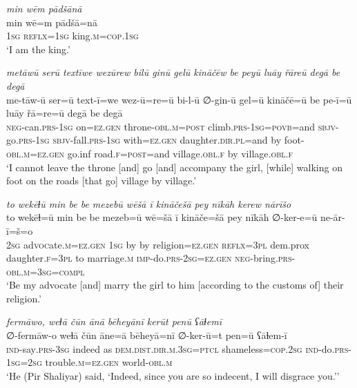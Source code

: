 \ea \label{ŽP.160}
\textit{min wēm pādšānā} \\ 
\gll min wē=m pādšā=nā \\ 
 \textsc{1sg} \textsc{reflx}\textsc{=\textsc{1sg}} king\textsc{.m}\textsc{=cop}\textsc{.\textsc{1sg}} \\ 
\glt `I am the king.'
\z 
 
\ea \label{ŽP.161}
\textit{metāwū serū textīwe wezūrew bilū ginū gelū kināčēw be peyū luāy řāreū degā be degā} \\ 
\gll me-tāw-ū ser=ū text-ī=we wez-ū=re=ū bi-l-ū ∅-gin-ū gel=ū kināčē=ū be pe-ī=ū luāy řā=re=ū degā be degā \\ 
 \textsc{neg-}can\textsc{.prs}\textsc{-\textsc{1sg}} on\textsc{\textsc{=ez.gen}} throne\textsc{-obl}\textsc{.m}\textsc{=\textsc{post}} climb\textsc{.prs}\textsc{-\textsc{1sg}}\textsc{=\textsc{povb}}=and \textsc{sbjv-}go\textsc{.prs}\textsc{-\textsc{1sg}} \textsc{sbjv-}fall\textsc{.prs}\textsc{-\textsc{1sg}} with\textsc{\textsc{=ez.gen}} daughter\textsc{.dir}\textsc{.pl}=and by foot\textsc{-obl}\textsc{.m}\textsc{\textsc{=ez.gen}} go.inf road\textsc{.f}\textsc{=\textsc{post}}=and village\textsc{.obl}\textsc{.f} by village\textsc{.obl}\textsc{.f} \\ 
\glt `I cannot leave the throne [and] go [and] accompany the girl, [while] walking on foot on the roads [that go] village by village.'
\z 
 
\ea \label{ŽP.165}
\textit{to wekēɫū min be be mezebū wēšā ī kināčešā pey nīkāh kerew nārīšo} \\ 
\gll to wekēɫ=ū min be be mezeb=ū wē=šā ī kināče=šā pey nīkāh ∅-ker-e=ū ne-ār-ī=š=o \\ 
 \textsc{2sg} ad\textsc{voc}ate\textsc{.m}\textsc{\textsc{=ez.gen}} \textsc{1sg} by by religion\textsc{\textsc{=ez.gen}} \textsc{reflx}\textsc{=3pl} dem.prox daughter\textsc{.f}\textsc{=3pl} to marriage\textsc{.m} \textsc{imp-}do\textsc{.prs}-\textsc{2sg}\textsc{\textsc{=ez.gen}} \textsc{neg-}bring\textsc{.prs}\textsc{-obl}\textsc{.m}\textsc{=3sg}\textsc{=compl} \\ 
\glt `Be my advocate [and] marry the girl to him [according to the customs of] their religion.'
\z 
 
\ea \label{ŽP.198}
\textit{fermāwo, weɫā čūn ānā bēheyānī kerūt penū ʕāɫemī} \\ 
\gll ∅-fermāw-o weɫā čūn āne=ā bēheyā=nī ∅-ker-ū=t pen=ū ʕāɫem-ī \\ 
 \textsc{ind-}say\textsc{.prs}\textsc{-3sg} indeed as \textsc{dem.dist}\textsc{.dir}\textsc{.m}\textsc{.3sg}=\textsc{ptcl} shameless\textsc{=cop}\textsc{.\textsc{2sg}} \textsc{ind-}do\textsc{.prs}\textsc{-\textsc{1sg}}\textsc{=\textsc{2sg}} trouble\textsc{.m}\textsc{\textsc{=ez.gen}} world\textsc{-obl}\textsc{.m} \\ 
\glt `He (Pir Shaliyar) said, ‘Indeed, since you are so indecent, I will disgrace you.’'
\z 
 
